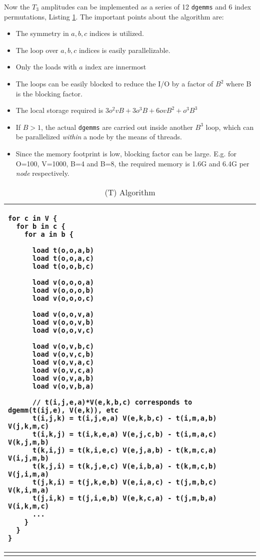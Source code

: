 \documentclass[12pt]{article} \usepackage[margin=1in]{geometry}
\newenvironment{listing}%
               {\begin{table}
                   \begin{tabular}{ p{6in} }
                     \hline}%
               {\end{tabular}%
               \end{table}}
\begin{document}
Now the $T_3$ amplitudes can be implemented as a series of 12 {\tt dgemms}
and 6 index permutations, Listing \ref{(t)}.
The important points about the algorithm are:
\begin{itemize}
\item The symmetry in $a,b,c$ indices is utilized.
\item The loop over $a,b,c$ indices is easily parallelizable.
\item Only the loads with $a$ index are innermost
\item The loops can be easily blocked to reduce the I/O by a factor of
  $B^2$ where B is the blocking factor.
\item The local storage required is $3o^2vB + 3o^3B + 6ovB^2 +
  o^3B^3$
\item If $B > 1$, the actual {\tt dgemms} are carried out inside
  another $B^3$ loop, which can be parallelized {\it within} a node by
  the means of   threads.
\item Since the memory footprint is low, blocking factor can be
  large.  E.g. for O=100, V=1000, B=4 and B=8, the required memory is
  1.6G and 6.4G per {\it node} respectively.
\end{itemize}

\begin {listing}
\begin {verbatim}
for c in V {
  for b in c {
    for a in b {

      load t(o,o,a,b)
      load t(o,o,a,c)
      load t(o,o,b,c)

      load v(o,o,o,a)
      load v(o,o,o,b)
      load v(o,o,o,c)

      load v(o,o,v,a)
      load v(o,o,v,b)
      load v(o,o,v,c)

      load v(o,v,b,c)
      load v(o,v,c,b)
      load v(o,v,a,c)
      load v(o,v,c,a)
      load v(o,v,a,b)
      load v(o,v,b,a)

      // t(i,j,e,a)*V(e,k,b,c) corresponds to dgemm(t(ij,e), V(e,k)), etc
      t(i,j,k) = t(i,j,e,a) V(e,k,b,c) - t(i,m,a,b) V(j,k,m,c)
      t(i,k,j) = t(i,k,e,a) V(e,j,c,b) - t(i,m,a,c) V(k,j,m,b)
      t(k,i,j) = t(k,i,e,c) V(e,j,a,b) - t(k,m,c,a) V(i,j,m,b)
      t(k,j,i) = t(k,j,e,c) V(e,i,b,a) - t(k,m,c,b) V(j,i,m,a)
      t(j,k,i) = t(j,k,e,b) V(e,i,a,c) - t(j,m,b,c) V(k,i,m,a)
      t(j,i,k) = t(j,i,e,b) V(e,k,c,a) - t(j,m,b,a) V(i,k,m,c)
      ...
    }
  }
}
\end{verbatim} \\
\hline
\caption{(T) Algorithm}
\label{(t)}
\end{listing}
\end{document}
